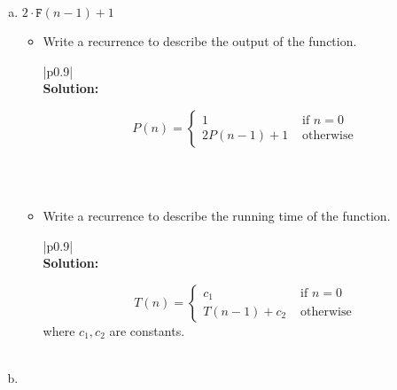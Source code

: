 \documentclass[12pt]{article}
\newenvironment{solution}
	{\begin{center}
	\begin{tabular}{|p{0.9\textwidth}|}
	\hline\\
	\textbf{Solution:}
	}
	{\\\\
	\hline
	\end{tabular}
	\end{center}
	}
\begin{document}
\begin{enumerate}[a)]
\item \begin{algorithm}
\begin{algorithmic}
			\State {}
		\Else
			\State \Return $2 \cdot \texttt{F}(n-1) + 1$
		\EndIf
	\EndFunction
\end{algorithmic}
\end{algorithm}

\begin{itemize}
	\item Write a recurrence to describe the output of the function.
	\begin{solution}
		\[ P(n) = \begin{cases} 1 &\text{ if } n=0 \\
						2P(n-1) + 1 &\text{ otherwise}
		\end{cases}\]
		
	
	\end{solution}
	
	\item Write a recurrence to describe the running time of the function.
	\begin{solution}
			\[ T(n) = \begin{cases} c_1 &\text{ if } n=0\\
								T(n-1) + c_2 &\text{ otherwise}
		\end{cases}\]
		where $c_1, c_2$ are constants.
	\end{solution}
\end{itemize}

\item \begin{algorithm}
\begin{algorithmic}
			\State {}
		\EndIf
		

\end{algorithmic}
\end{algorithm}
\end{enumerate}
\end{document}
